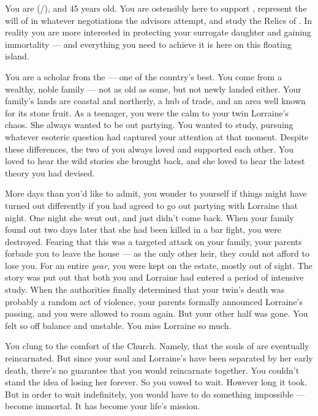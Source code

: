 \documentclass[char]{GL2020}
\begin{document}
\name{\cWildCard{}}

You are \cWildCard{\full} (\cWildCard{\they}/\cWildCard{\them}), and 45 years old. You are ostensibly here to support \cEvil{\full}, represent the will of \cQueen{\full} in whatever negotiations the advisors attempt, and study the Relics of \pEarth{}. In reality you are more interested in protecting your surrogate daughter and gaining immortality — and everything you need to achieve it is here on this floating island.

You are a scholar from the \pFarm{} — one of the country’s best. You come from a wealthy, noble family — not as old as some, but not newly landed either. Your family’s lands are coastal and northerly, a hub of trade, and an area well known for its stone fruit. As a teenager, you were the calm to your twin Lorraine’s chaos. She always wanted to be out partying. You wanted to study, pursuing whatever esoteric question had captured your attention at that moment. Despite these differences, the two of you always loved and supported each other. You loved to hear the wild stories she brought back, and she loved to hear the latest theory you had devised.

More days than you’d like to admit, you wonder to yourself if things might have turned out differently if you had agreed to go out partying with Lorraine that night. One night she went out, and just didn’t come back. When your family found out two days later that she had been killed in a bar fight, you were destroyed. Fearing that this was a targeted attack on your family, your parents forbade you to leave the house — as the only other heir, they could not afford to lose you. For an entire \emph{year}, you were kept on the \cWildCard{\formal} estate, mostly out of sight. The story was put out that both you and Lorraine had entered a period of intensive study. When the authorities finally determined that your twin’s death was probably a random act of violence, your parents formally announced Lorraine’s passing, and you were allowed to roam again. But your other half was gone. You felt so off balance and unstable. You miss Lorraine so much.

You clung to the comfort of the Church. Namely, that the souls of \pFarmers{} are eventually reincarnated. But since your soul and Lorraine’s have been separated by her early death, there’s no guarantee that you would reincarnate together. You couldn’t stand the idea of losing her forever. So you vowed to wait. However long it took. But in order to wait indefinitely, you would have to do something impossible — become immortal. It has become your life’s mission.
\end{document}
